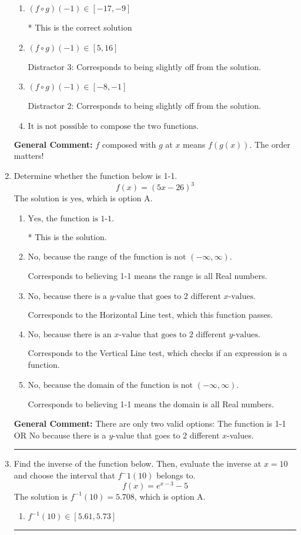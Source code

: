 \documentclass{extbook}[14pt]
\newcommand{\litem}[1]{\item #1

\rule{\textwidth}{0.4pt}}
\begin{document}
\begin{enumerate}
{\begin{enumerate}[label=\Alph*.]
 Distractor 1: Corresponds to reversing the composition.
\item \( (f \circ g)(-1) \in [-17, -9] \)

* This is the correct solution
\item \( (f \circ g)(-1) \in [5, 16] \)

 Distractor 3: Corresponds to being slightly off from the solution.
\item \( (f \circ g)(-1) \in [-8, -1] \)

 Distractor 2: Corresponds to being slightly off from the solution.
\item \( \text{It is not possible to compose the two functions.} \)


\end{enumerate}

\textbf{General Comment:} $f$ composed with $g$ at $x$ means $f(g(x))$. The order matters!
}
\litem{
Determine whether the function below is 1-1.
\[ f(x) = (5 x - 26)^3 \]The solution is \( \text{yes} \), which is option A.\begin{enumerate}[label=\Alph*.]
\item \( \text{Yes, the function is 1-1.} \)

* This is the solution.
\item \( \text{No, because the range of the function is not $(-\infty, \infty)$.} \)

Corresponds to believing 1-1 means the range is all Real numbers.
\item \( \text{No, because there is a $y$-value that goes to 2 different $x$-values.} \)

Corresponds to the Horizontal Line test, which this function passes.
\item \( \text{No, because there is an $x$-value that goes to 2 different $y$-values.} \)

Corresponds to the Vertical Line test, which checks if an expression is a function.
\item \( \text{No, because the domain of the function is not $(-\infty, \infty)$.} \)

Corresponds to believing 1-1 means the domain is all Real numbers.
\end{enumerate}

\textbf{General Comment:} There are only two valid options: The function is 1-1 OR No because there is a $y$-value that goes to 2 different $x$-values.
}
\litem{
Find the inverse of the function below. Then, evaluate the inverse at $x = 10$ and choose the interval that $f^-1(10)$ belongs to.
\[ f(x) = e^{x-3}-5 \]The solution is \( f^{-1}(10) = 5.708 \), which is option A.\begin{enumerate}[label=\Alph*.]
\item \( f^{-1}(10) \in [5.61, 5.73] \)


\end{enumerate}}
\end{enumerate}
\end{document}
